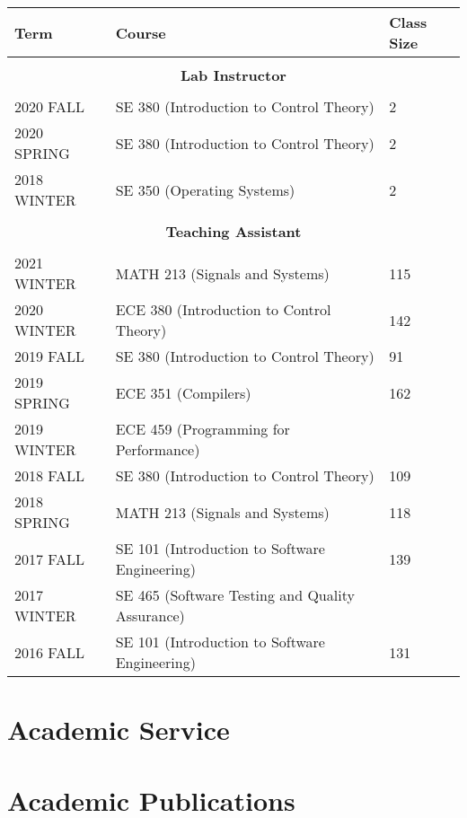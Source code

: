 \documentclass[oneside, 10pt]{memoir}
\begin{document}
\begin{longtable}{l|l|l}
    \textbf{Term} & \textbf{Course} & \textbf{Class Size}\\ \hline\hline
    & & \\\hline
    \multicolumn{3}{c}{\textbf{Lab Instructor}}\\\hline
    & & \\
    {2020 FALL  } & {SE 380 (Introduction to Control Theory)} & 2\\
    {2020 SPRING} & {SE 380 (Introduction to Control Theory)} & 2\\
    {2018 WINTER} & {SE 350 (Operating Systems)} & 2\\
    & & \\\hline
    \multicolumn{3}{c}{\textbf{Teaching Assistant}}\\\hline
    & & \\
    {2021 WINTER} & {MATH 213 (Signals and Systems)} & 115\\
    {2020 WINTER} & {ECE 380 (Introduction to Control Theory)} & 142\\
    {2019 FALL  } & {SE 380 (Introduction to Control Theory)} & 91\\
    {2019 SPRING} & {ECE 351 (Compilers)} & 162\\
    {2019 WINTER} & {ECE 459 (Programming for Performance)} & \\
    {2018 FALL  } & {SE 380 (Introduction to Control Theory)} & 109\\
    {2018 SPRING} & {MATH 213 (Signals and Systems)} & 118\\
    {2017 FALL  } & {SE 101 (Introduction to Software Engineering)} & 139\\
    {2017 WINTER} & {SE 465 (Software Testing and Quality Assurance)} & \\
    {2016 FALL  } & {SE 101 (Introduction to Software Engineering)} & 131
\end{longtable}

\section*{Academic Service}

\section*{Academic Publications}
\end{document}

